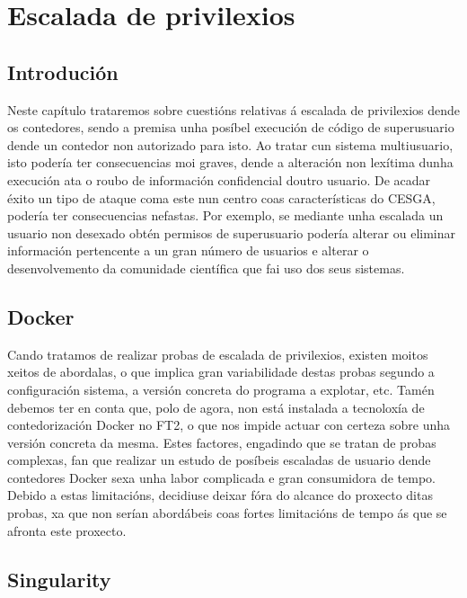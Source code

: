 \chapter{Escalada de privilexios}
\minitoc
\clearpage

\section{Introdución}

Neste capítulo trataremos sobre cuestións relativas á escalada de privilexios dende os contedores, sendo a premisa unha posíbel execución de código de superusuario dende un contedor non autorizado para isto. Ao tratar cun sistema multiusuario, isto podería ter consecuencias moi graves, dende a alteración non lexítima dunha execución ata o roubo de información confidencial doutro usuario. De acadar éxito un tipo de ataque coma este nun centro coas características do \gls{CESGA}, podería ter consecuencias nefastas. Por exemplo, se mediante unha escalada un usuario non desexado obtén permisos de superusuario podería alterar ou eliminar información pertencente a un gran número de usuarios e alterar o desenvolvemento da comunidade científica que fai uso dos seus sistemas.

\section{Docker}

Cando tratamos de realizar probas de escalada de privilexios, existen moitos xeitos de abordalas, o que implica gran variabilidade destas probas segundo a configuración sistema, a versión concreta do programa a explotar, etc. Tamén debemos ter en conta que, polo de agora, non está instalada a tecnoloxía de contedorización Docker no \gls{FT2}, o que nos impide actuar con certeza sobre unha versión concreta da mesma. Estes factores, engadindo que se tratan de probas complexas, fan que realizar un estudo de posíbeis escaladas de usuario dende contedores Docker sexa unha labor complicada e gran consumidora de tempo. Debido a estas limitacións, decidiuse deixar fóra do alcance do proxecto ditas probas, xa que non serían abordábeis coas fortes limitacións de tempo ás que se afronta este proxecto.

\section{Singularity}
\label{demo-fail-escalada}

